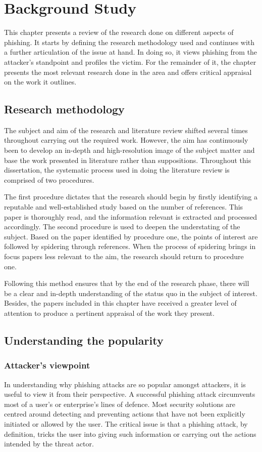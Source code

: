 \raggedbottom
\chapter{Background Study}
\label{chap:background_study}
This chapter presents a review of the research done on different aspects of phishing. It starts by defining the research methodology used and continues with a further articulation of the issue at hand. In doing so, it views phishing from the attacker's standpoint and profiles the victim. For the remainder of it, the chapter presents the most relevant research done in the area and offers critical appraisal on the work it outlines.


\section{Research methodology}
\label{sec:research_methodology}
The subject and aim of the research and literature review shifted several times throughout carrying out the required work. However, the aim has continuously been to develop an in-depth and high-resolution image of the subject matter and base the work presented in literature rather than suppositions. Throughout this dissertation, the systematic process used in doing the literature review is comprised of two procedures.

The first procedure dictates that the research should begin by firstly identifying a reputable and well-established study based on the number of references. This paper is thoroughly read, and the information relevant is extracted and processed accordingly.
The second procedure is used to deepen the understating of the subject. Based on the paper identified by procedure one, the points of interest are followed by spidering through references. When the process of spidering brings in focus papers less relevant to the aim, the research should return to procedure one.

Following this method ensures that by the end of the research phase, there will be a clear and in-depth understanding of the status quo in the subject of interest. Besides, the papers included in this chapter have received a greater level of attention to produce a pertinent appraisal of the work they present.


\section{Understanding the popularity}
\subsection{Attacker's viewpoint}
\label{subsec:attackers_viewpoint}
In understanding why phishing attacks are so popular amongst attackers, it is useful to view it from their perspective. A successful phishing attack circumvents most of a user's or enterprise's lines of defence. Most security solutions are centred around detecting and preventing actions that have not been explicitly initiated or allowed by the user. The critical issue is that a phishing attack, by definition, tricks the user into giving such information or carrying out the actions intended by the threat actor.

